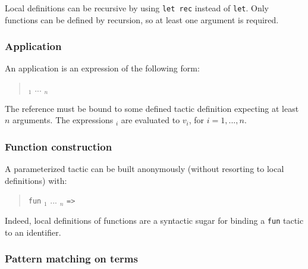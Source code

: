 Local definitions can be recursive by using {\tt let rec} instead of
{\tt let}. Only functions can be defined by recursion, so at least one
argument is required.

\subsubsection{Application}

An application is an expression of the following form:
\begin{quote}
{\qualid} {\tacarg}$_1$ ... {\tacarg}$_n$
\end{quote}
The reference {\qualid} must be bound to some defined tactic
definition expecting at least $n$ arguments.  The expressions
{\tacexpr}$_i$ are evaluated to $v_i$, for $i=1,...,n$.


\subsubsection[Function construction]{Function construction
}

A parameterized tactic can be built anonymously (without resorting to
local definitions) with:
\begin{quote}
{\tt fun} {\ident${}_1$} ... {\ident${}_n$} {\tt =>} {\tacexpr}
\end{quote}
Indeed, local definitions of functions are a syntactic sugar for
binding a {\tt fun} tactic to an identifier.

\subsubsection[Pattern matching on terms]{Pattern matching on terms
}

